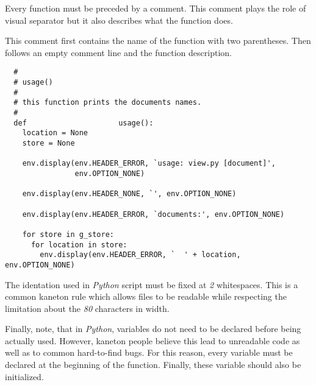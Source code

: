 Every function must be preceded by a comment. This comment plays the role
of visual separator but it also describes what the function does.

This comment first contains the name of the function with two parentheses.
Then follows an empty comment line and the function description.

\begin{verbatim}
  #
  # usage()
  #
  # this function prints the documents names.
  #
  def                     usage():
    location = None
    store = None

    env.display(env.HEADER_ERROR, `usage: view.py [document]',
                env.OPTION_NONE)

    env.display(env.HEADER_NONE, `', env.OPTION_NONE)

    env.display(env.HEADER_ERROR, `documents:', env.OPTION_NONE)

    for store in g_store:
      for location in store:
        env.display(env.HEADER_ERROR, `  ' + location, env.OPTION_NONE)
\end{verbatim}

The identation used in \textit{Python} script must be fixed at \textit{2}
whitespaces. This is a common kaneton rule which allows files to be
readable while respecting the limitation about the \textit{80} characters
in width.

Finally, note, that in \textit{Python}, variables do not need to be declared
before being actually used. However, kaneton people believe this lead
to unreadable code as well as to common hard-to-find bugs. For this reason,
every variable must be declared at the beginning of the function. Finally,
these variable should also be initialized.
